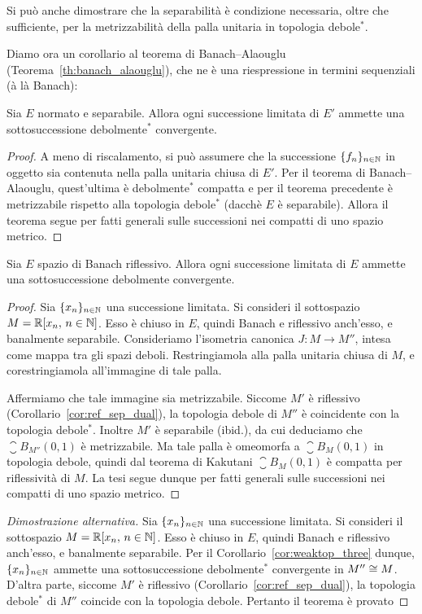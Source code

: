 \begin{remark}
	Si può anche dimostrare che la separabilità è condizione necessaria, oltre che sufficiente, per la metrizzabilità della palla unitaria in topologia debole$^*$.
\end{remark}

Diamo ora un corollario al teorema di Banach--Alaouglu (Teorema~\ref{th:banach_alaouglu}), che ne è una riespressione in termini sequenziali (à là Banach):

\begin{corollary}
\label{cor:weaktop_three}
	Sia $E$ normato e separabile.
	Allora ogni successione limitata di $E'$ ammette una sottosuccessione debolmente$^*$ convergente.
\end{corollary}
\begin{proof}
	A meno di riscalamento, si può assumere che la successione $\{f_n\}_{n \in \mathbb{N}}$ in oggetto sia contenuta nella palla unitaria chiusa di $E'$. Per il teorema di Banach--Alaouglu, quest'ultima è debolmente$^*$ compatta e per il teorema precedente è metrizzabile rispetto alla topologia debole$^*$ (dacchè $E$ è separabile). Allora il teorema segue per fatti generali sulle successioni nei compatti di uno spazio metrico.
\end{proof}

\begin{theorem}
	Sia $E$ spazio di Banach riflessivo.
	Allora ogni successione limitata di $E$ ammette una sottosuccessione debolmente convergente.
\end{theorem}
\begin{proof}
	Sia $\{x_n\}_{n \in \mathbb{N}}$ una successione limitata.
	Si consideri il sottospazio $M = \mathbb{R}[x_n,\, n \in \mathbb{N}]$. Esso è chiuso in $E$, quindi Banach e riflessivo anch'esso, e banalmente separabile.
	Consideriamo l'isometria canonica $J : M \to M''$, intesa come mappa tra gli spazi deboli. Restringiamola alla palla unitaria chiusa di $M$, e corestringiamola all'immagine di tale palla.

	Affermiamo che tale immagine sia metrizzabile. Siccome $M'$ è riflessivo (Corollario~\ref{cor:ref_sep_dual}), la topologia debole di $M''$ è coincidente con la topologia debole$^*$.
	Inoltre $M'$ è separabile (ibid.), da cui deduciamo che $\closure B_{M''}(0,1)$ è metrizzabile.
	Ma tale palla è omeomorfa a $\closure B_M(0,1)$ in topologia debole, quindi dal teorema di Kakutani $\closure B_M(0,1)$ è compatta per riflessività di $M$.
	La tesi segue dunque per fatti generali sulle successioni nei compatti di uno spazio metrico.
\end{proof}
\begin{proof}[Dimostrazione alternativa]
	Sia $\{x_n\}_{n \in \mathbb{N}}$ una successione limitata.
	Si consideri il sottospazio $M = \mathbb{R}[x_n,\, n \in \mathbb{N}]$. Esso è chiuso in $E$, quindi Banach e riflessivo anch'esso, e banalmente separabile.
	Per il Corollario~\ref{cor:weaktop_three} dunque, $\{x_n\}_{n \in \mathbb{N}}$ ammette una sottosuccessione debolmente$^*$ convergente in $M'' \overset{}{\cong} M$.
	D'altra parte, siccome $M'$ è riflessivo (Corollario~\ref{cor:ref_sep_dual}), la topologia debole$^*$ di $M''$ coincide con la topologia debole. Pertanto il teorema è provato
\end{proof}

